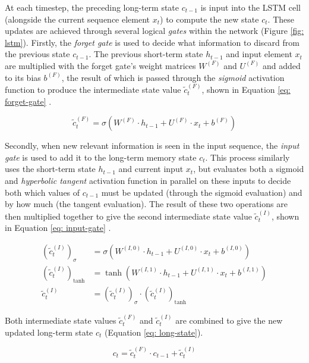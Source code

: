 \documentclass[a4paper, 11pt]{report}
\begin{document}
    At each timestep, the preceding long-term state $c_{t-1}$ is input into the LSTM cell (alongside the current sequence element $x_t$) to compute the new state $c_t$. These updates are achieved through several logical \emph{gates} within the network (Figure \ref{fig: lstm}). Firstly, the \emph{forget gate} is used to decide what information to discard from the previous state $c_{t-1}$. The previous short-term state $h_{t-1}$ and input element $x_t$ are multiplied with the forget gate's weight matrices $W^{(F)}$ and $U^{(F)}$ and added to its bias $b^{(F)}$, the result of which is passed through the \emph{sigmoid} activation function to produce the intermediate state value $\tilde{c}^{(F)}_t$, shown in Equation \ref{eq: forget-gate} \citep{zhang-2021}.

    \begin{equation}
        \label{eq: forget-gate}
        \tilde{c}^{(F)}_t = \sigma( W^{(F)} \cdot h_{t-1} + U^{(F)} \cdot x_t + b^{(F)} )
    \end{equation}

    Secondly, when new relevant information is seen in the input sequence, the \emph{input gate} is used to add it to the long-term memory state $c_t$. This process similarly uses the short-term state $h_{t-1}$ and current input $x_t$, but evaluates both a sigmoid and \emph{hyperbolic tangent} activation function in parallel on these inputs to decide both which values of $c_{t-1}$ must be updated (through the sigmoid evaluation) and by how much (the tangent evaluation). The result of these two operations are then multiplied together to give the second intermediate state value $\tilde{c}^{(I)}_t$, shown in Equation \ref{eq: input-gate} \citep{zhang-2021}.

    \begin{align}
        \label{eq: input-gate}
        (\tilde{c}^{(I)}_t)_{\sigma} &= \sigma( W^{(I,0)} \cdot h_{t-1} + U^{(I,0)} \cdot x_t + b^{(I,0)} ) \\
        (\tilde{c}^{(I)}_t)_{\tanh} &= \tanh{( W^{(I,1)} \cdot h_{t-1} + U^{(I,1)} \cdot x_t + b^{(I,1)} )} \\
        \tilde{c}^{(I)}_t &= (\tilde{c}^{(I)}_t)_{\sigma} \cdot (\tilde{c}^{(I)}_t)_{\tanh}
    \end{align}

    Both intermediate state values $\tilde{c}^{(F)}_t$ and $\tilde{c}^{(I)}_t$ are combined to give the new updated long-term state $c_t$ (Equation \ref{eq: long-state}).

    \begin{equation}
        \label{eq: long-state}
        c_t = \tilde{c}^{(F)}_t \cdot c_{t-1} + \tilde{c}^{(I)}_t
    \end{equation}
\end{document}
